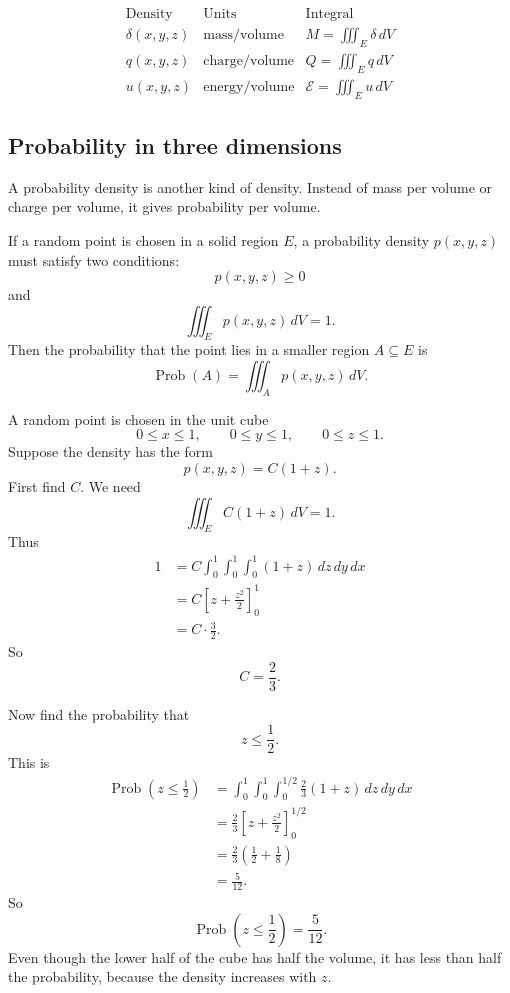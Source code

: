 \[
\begin{array}{c|c|c}
\text{Density} & \text{Units} & \text{Integral} \\ \hline
\delta(x,y,z) & \text{mass}/\text{volume} &
\displaystyle M=\iiint_E \delta\,dV \\[3mm]
q(x,y,z) & \text{charge}/\text{volume} &
\displaystyle Q=\iiint_E q\,dV \\[3mm]
u(x,y,z) & \text{energy}/\text{volume} &
\displaystyle \mathcal E=\iiint_E u\,dV
\end{array}
\]

\subsection{Probability in three dimensions}

A probability density is another kind of density.  Instead of mass per volume or charge
per volume, it gives probability per volume.

If a random point is chosen in a solid region \(E\), a probability density \(p(x,y,z)\)
must satisfy two conditions:
\[
    p(x,y,z)\ge0
\]
and
\[
    \iiint_E p(x,y,z)\,dV=1.
\]
Then the probability that the point lies in a smaller region \(A\subseteq E\) is
\[
\boxed{
    \operatorname{Prob}(A)=\iiint_A p(x,y,z)\,dV.
}
\]

\begin{example}
A random point is chosen in the unit cube
\[
    0\le x\le1,
    \qquad
    0\le y\le1,
    \qquad
    0\le z\le1.
\]
Suppose the density has the form
\[
    p(x,y,z)=C(1+z).
\]
First find \(C\).  We need
\[
    \iiint_E C(1+z)\,dV=1.
\]
Thus
\[
\begin{aligned}
1
&=
C\int_0^1\int_0^1\int_0^1(1+z)\,dz\,dy\,dx\\
&=
C\left[z+\frac{z^2}{2}\right]_0^1\\
&=
C\cdot\frac32.
\end{aligned}
\]
So
\[
\boxed{
    C=\frac23.
}
\]

Now find the probability that
\[
    z\le\frac12.
\]
This is
\[
\begin{aligned}
\operatorname{Prob}\left(z\le\frac12\right)
&=
\int_0^1\int_0^1\int_0^{1/2}
\frac23(1+z)\,dz\,dy\,dx\\
&=
\frac23
\left[z+\frac{z^2}{2}\right]_0^{1/2}\\
&=
\frac23\left(\frac12+\frac18\right)\\
&=
\frac{5}{12}.
\end{aligned}
\]
So
\[
\boxed{
    \operatorname{Prob}\left(z\le\frac12\right)=\frac{5}{12}.
}
\]
Even though the lower half of the cube has half the volume, it has less than half the
probability, because the density increases with \(z\).
\end{example}

